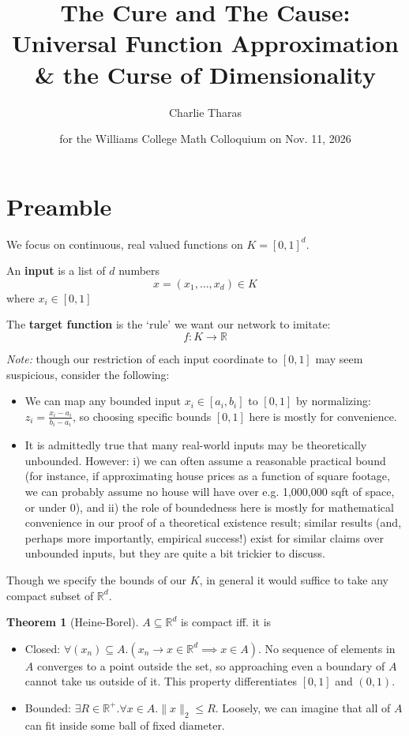 \documentclass{article}
\title{The Cure and The Cause: Universal Function Approximation \& the Curse of Dimensionality}
\author{Charlie Tharas}
\date{for the Williams College Math Colloquium on Nov. 11, 2026}
\theoremstyle{definition}
\newtheorem{theorem}{Theorem}
\newcommand{\note}{\textit{Note: }}
\begin{document}
\maketitle

\section{Preamble}

We focus on continuous, real valued functions on $K = [0, 1]^d$.

An \textbf{input} is a list of $d$ numbers
$$x = (x_1, \dots, x_d) \in K$$
where $x_i \in [0, 1]$

The \textbf{target function} is the `rule' we want our network to imitate:
$$f : K \to \mathbb{R}$$

\begin{aside}
\note though our restriction of each input coordinate to $[0, 1]$ may seem suspicious, consider the following:
\begin{itemize}
    \item We can map any bounded input $x_i \in [a_i, b_i]$ to $[0, 1]$ by normalizing: $z_i = \frac{x_i-a_i}{b_i-a_i}$, so choosing specific bounds $[0, 1]$ here is mostly for convenience.
    \item It is admittedly true that many real-world inputs may be theoretically unbounded. However: i) we can often assume a reasonable practical bound (for instance, if approximating house prices as a function of square footage, we can probably assume no house will have over e.g. 1,000,000 sqft of space, or under 0), and ii) the role of boundedness here is mostly for mathematical convenience in our proof of a theoretical existence result; similar results (and, perhaps more importantly, empirical success!) exist for similar claims over unbounded inputs, but they are quite a bit trickier to discuss.
\end{itemize}
\end{aside}

Though we specify the bounds of our $K$, in general it would suffice to take any compact subset of $\mathbb{R}^d$.

\begin{theorem}[Heine-Borel] $A \subseteq \mathbb{R}^d$ is compact iff. it is
\begin{itemize}
    \item Closed: $\forall (x_n) \subseteq A.(x_n \to x \in \mathbb{R}^d \implies x \in A)$. No sequence of elements in $A$ converges to a point outside the set, so approaching even a boundary of $A$ cannot take us outside of it. This property differentiates $[0, 1]$ and $(0, 1)$.
    \item Bounded: $\exists R \in \mathbb{R}^+.\forall x \in A.\|x\|_2 \le R$. Loosely, we can imagine that all of $A$ can fit inside some ball of fixed diameter.
\end{itemize}
\end{theorem}
\end{document}
